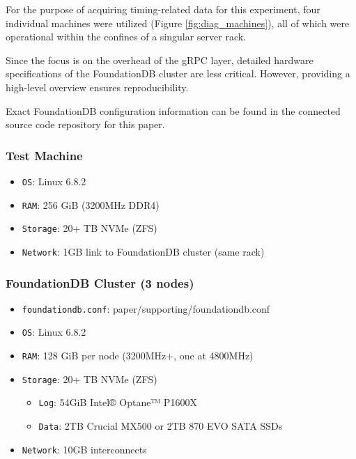 \documentclass[sigconf]{acmart}
\begin{document}
For the purpose of acquiring timing-related data for this experiment, four individual machines were utilized (Figure \ref{fig:diag_machines}), all of which were operational within the confines of a singular server rack.

Since the focus is on the overhead of the gRPC layer, detailed hardware specifications of the FoundationDB cluster are less critical. However, providing a high-level overview ensures reproducibility.

Exact FoundationDB configuration information can be found in the connected source code repository\cite{PaperGithub} for this paper.

\subsubsection{Test Machine}

\begin{itemize}
\item {\texttt{OS}}: Linux 6.8.2
\item{\texttt{RAM}}: 256 GiB (3200MHz DDR4)
\item{\texttt{Storage}}: 20+ TB NVMe (ZFS)
\item{\texttt{Network}}: 1GB link to FoundationDB cluster (same rack)
\end{itemize}

\subsubsection{FoundationDB Cluster (3 nodes)}

\begin{itemize}
    \item {\texttt{foundationdb.conf}}: paper/supporting/foundationdb.conf
    \item {\texttt{OS}}: Linux 6.8.2
    \item{\texttt{RAM}}: 128 GiB per node (3200MHz+, one at 4800MHz)
    \item{\texttt{Storage}}: 20+ TB NVMe (ZFS)
    \begin{itemize}
        \item{\texttt{Log}}: 54GiB Intel® Optane™ P1600X
        \item{\texttt{Data}}: 2TB Crucial MX500 or 2TB 870 EVO SATA SSDs
    \end{itemize}
    \item{\texttt{Network}}: 10GB interconnects
\end{itemize}
\end{document}
